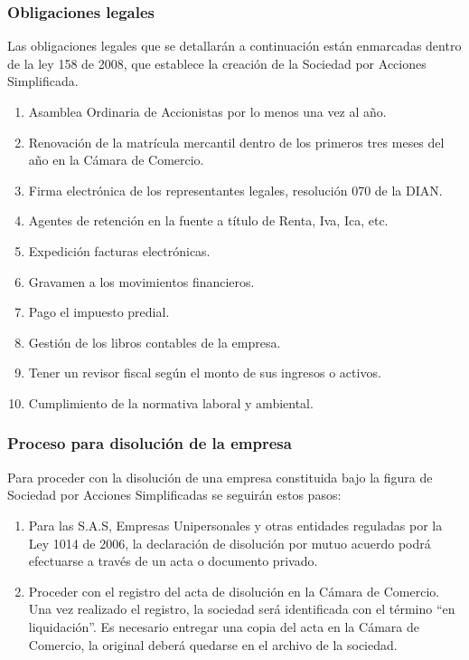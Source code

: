 {\subsubsection*{Obligaciones legales}

Las obligaciones legales que se detallarán a continuación están enmarcadas dentro de la ley 158 de 2008, que establece la creación de la Sociedad por Acciones Simplificada.

\begin{enumerate}
    \item Asamblea Ordinaria de Accionistas por lo menos una vez al año.
    \item Renovación de la matrícula mercantil dentro de los primeros tres meses del año en la Cámara de Comercio.
    \item Firma electrónica de los representantes legales, resolución 070 de la DIAN.
    \item Agentes de retención en la fuente a título de Renta, Iva, Ica, etc.
    \item Expedición facturas electrónicas.
    \item Gravamen a los movimientos financieros.
    \item Pago el impuesto predial.
    \item Gestión de los libros contables de la empresa.
    \item Tener un revisor fiscal según el monto de sus ingresos o activos.
    \item Cumplimiento de la normativa laboral y ambiental. 
\end{enumerate}

\subsubsection*{Proceso para disolución de la empresa}

Para proceder con la disolución de una empresa constituida bajo la figura de Sociedad por Acciones Simplificadas se seguirán estos pasos:

\begin{enumerate}
    \item Para las S.A.S, Empresas Unipersonales y otras entidades reguladas por la Ley 1014 de 2006, la declaración de disolución por mutuo acuerdo podrá efectuarse a través de un acta o documento privado.
    
    \item Proceder con el registro del acta de disolución en la Cámara de Comercio. Una vez realizado el registro, la sociedad será identificada con el término “en liquidación”. Es necesario entregar una copia del acta en la Cámara de Comercio, la original deberá quedarse en el archivo de la sociedad.
    

\end{enumerate}}
